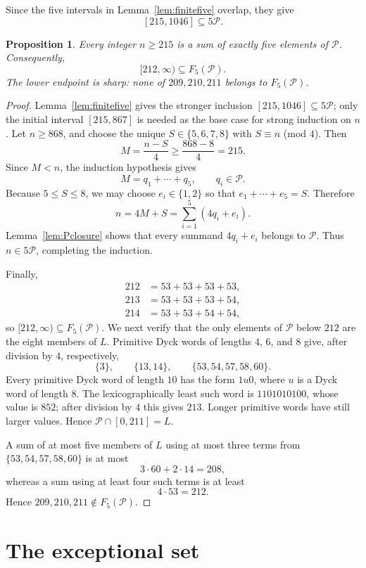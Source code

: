 \documentclass[12pt]{article}
\theoremstyle{plain}
\newtheorem{proposition}[theorem]{Proposition}
\newcommand{\Pset}{\mathcal P}
\begin{document}
Since the five intervals in Lemma~\ref{lem:finitefive} overlap, they give
\[
 [215,1046]\subseteq5\Pset.
\]

\begin{proposition}\label{prop:fiveP}
Every integer $n\geq215$ is a sum of exactly five elements of $\Pset$.
Consequently,
\[
 [212,\infty)\subseteq F_5(\Pset).
\]
The lower endpoint is sharp: none of $209,210,211$ belongs to
$F_5(\Pset)$.
\end{proposition}

\begin{proof}
Lemma~\ref{lem:finitefive} gives the stronger inclusion
$[215,1046]\subseteq5\Pset$; only the initial interval $[215,867]$ is
needed as the base case for strong induction on $n$.  Let $n\geq868$, and
choose the unique
$S\in\{5,6,7,8\}$ with $S\equiv n$ (mod $4$).  Then
\[
 M=\frac{n-S}{4}\geq\frac{868-8}{4}=215.
\]
Since $M<n$, the induction hypothesis gives
\[
 M=q_1+\cdots+q_5,\qquad q_i\in\Pset.
\]
Because $5\leq S\leq8$, we may choose $e_i\in\{1,2\}$ so that
$e_1+\cdots+e_5=S$.  Therefore
\[
 n=4M+S=\sum_{i=1}^{5}(4q_i+e_i).
\]
Lemma~\ref{lem:Pclosure} shows that every summand $4q_i+e_i$ belongs to
$\Pset$.  Thus $n\in5\Pset$, completing the induction.

Finally,
\[
\begin{aligned}
212&=53+53+53+53,\\
213&=53+53+53+54,\\
214&=53+53+54+54,
\end{aligned}
\]
so $[212,\infty)\subseteq F_5(\Pset)$.  We next verify that the only elements of $\Pset$ below $212$ are the
eight members of $L$.  Primitive Dyck words of lengths $4$, $6$, and $8$
give, after division by $4$, respectively,
\[
 \{3\},\qquad \{13,14\},\qquad \{53,54,57,58,60\}.
\]
Every primitive Dyck word of length $10$ has the form $1u0$, where $u$
is a Dyck word of length $8$.  The lexicographically least such word is
$1101010100$, whose value is $852$; after division by $4$ this gives
$213$.  Longer primitive words have still larger values.  Hence
$\Pset\cap[0,211]=L$.

A sum of at most five members of $L$ using at most three terms from
$\{53,54,57,58,60\}$ is at most
\[
 3\cdot60+2\cdot14=208,
\]
whereas a sum using at least four such terms is at least
\[
 4\cdot53=212.
\]
Hence $209,210,211\notin F_5(\Pset)$.
\end{proof}

\section{The exceptional set}\label{sec:exceptions}
\end{document}
